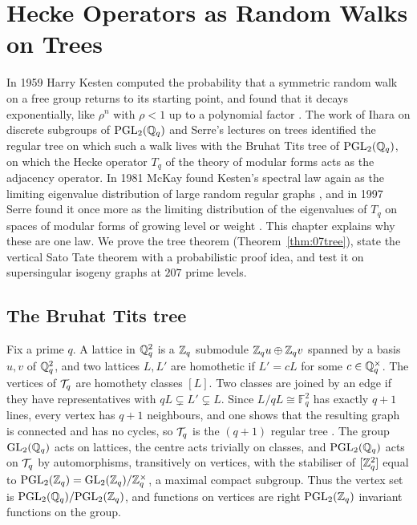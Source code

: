 \chapter{Hecke Operators as Random Walks on Trees}\label{ch:07}

In 1959 Harry Kesten computed the probability that a symmetric random walk on a free group returns to its starting point, and found that it decays exponentially, like $\rho^n$ with $\rho<1$ up to a polynomial factor \cite{kesten1959}. The work of Ihara on discrete subgroups of $\mathrm{PGL}_2(\mathbb{Q}_q)$ and Serre's lectures on trees \cite{ihara1966,serre1980} identified the regular tree on which such a walk lives with the Bruhat Tits tree of $\mathrm{PGL}_2(\mathbb{Q}_q)$, on which the Hecke operator $T_q$ of the theory of modular forms acts as the adjacency operator. In 1981 McKay found Kesten's spectral law again as the limiting eigenvalue distribution of large random regular graphs \cite{mckay1981}, and in 1997 Serre found it once more as the limiting distribution of the eigenvalues of $T_q$ on spaces of modular forms of growing level or weight \cite{serre1997}. This chapter explains why these are one law. We prove the tree theorem (Theorem~\ref{thm:07tree}), state the vertical Sato Tate theorem with a probabilistic proof idea, and test it on supersingular isogeny graphs at $207$ prime levels.

\section{The Bruhat Tits tree}

Fix a prime $q$. A lattice in $\mathbb{Q}_q^2$ is a $\mathbb{Z}_q$ submodule $\mathbb{Z}_qu\oplus\mathbb{Z}_qv$ spanned by a basis $u,v$ of $\mathbb{Q}_q^2$, and two lattices $L,L'$ are homothetic if $L'=cL$ for some $c\in\mathbb{Q}_q^\times$. The vertices of $\mathcal{T}_q$ are homothety classes $[L]$. Two classes are joined by an edge if they have representatives with $qL\subsetneq L'\subsetneq L$. Since $L/qL\cong\mathbb{F}_q^2$ has exactly $q+1$ lines, every vertex has $q+1$ neighbours, and one shows that the resulting graph is connected and has no cycles, so $\mathcal{T}_q$ is the $(q+1)$ regular tree \cite{serre1980}. The group $\mathrm{GL}_2(\mathbb{Q}_q)$ acts on lattices, the centre acts trivially on classes, and $\mathrm{PGL}_2(\mathbb{Q}_q)$ acts on $\mathcal{T}_q$ by automorphisms, transitively on vertices, with the stabiliser of $[\mathbb{Z}_q^2]$ equal to $\mathrm{PGL}_2(\mathbb{Z}_q)=\mathrm{GL}_2(\mathbb{Z}_q)/\mathbb{Z}_q^\times$, a maximal compact subgroup. Thus the vertex set is $\mathrm{PGL}_2(\mathbb{Q}_q)/\mathrm{PGL}_2(\mathbb{Z}_q)$, and functions on vertices are right $\mathrm{PGL}_2(\mathbb{Z}_q)$ invariant functions on the group.

